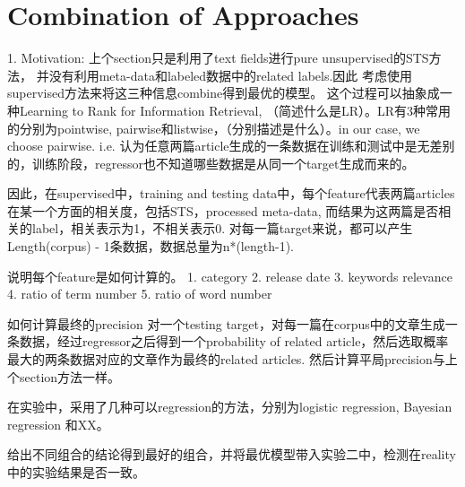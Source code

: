 \section{Combination of Approaches}
\label{sec:6}

1. Motivation:
上个section只是利用了text fields进行pure unsupervised的STS方法， 并没有利用meta-data和labeled数据中的related labels.因此 考虑使用supervised方法来将这三种信息combine得到最优的模型。 
这个过程可以抽象成一种Learning to Rank for Information Retrieval, （简述什么是LR）。LR有3种常用的分别为pointwise, pairwise和listwise，（分别描述是什么）。in our case, we choose pairwise. i.e. 认为任意两篇article生成的一条数据在训练和测试中是无差别的，训练阶段，regressor也不知道哪些数据是从同一个target生成而来的。


因此，在supervised中，training and testing data中，每个feature代表两篇articles在某一个方面的相关度，包括STS，processed meta-data, 而结果为这两篇是否相关的label，相关表示为1，不相关表示0. 对每一篇target来说，都可以产生Length(corpus) - 1条数据，数据总量为n*(length-1).

说明每个feature是如何计算的。
1. category
2. release date
3. keywords relevance 
4. ratio of term number
5. ratio of word number

如何计算最终的precision
对一个testing target，对每一篇在corpus中的文章生成一条数据，经过regressor之后得到一个probability of related article，然后选取概率最大的两条数据对应的文章作为最终的related articles. 然后计算平局precision与上个section方法一样。

在实验中，采用了几种可以regression的方法，分别为logistic regression, Bayesian regression 和XX。 

给出不同组合的结论得到最好的组合，并将最优模型带入实验二中，检测在reality中的实验结果是否一致。 

